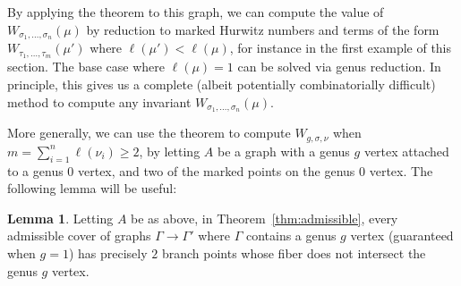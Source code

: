 \documentclass[thesis]{thesis-umich}           %
\theoremstyle{definition}
\newtheorem{lem}[thm]{Lemma}
\begin{document}

                By applying the theorem to this graph, we can compute the value of
                $W_{\sigma_1,\dots,\sigma_n}(\mu)$ by reduction to marked Hurwitz
                numbers and terms of the form
                $W_{\tau_1,\dots,\tau_m}(\mu')$ where $\ell(\mu')<\ell(\mu)$, for instance
                in the first example of this section.
                The base case where $\ell(\mu)=1$ can be solved via genus reduction.
                In principle, this gives us a complete (albeit potentially combinatorially difficult) method to compute any invariant $W_{\sigma_1,\dots,\sigma_n}(\mu)$.

                More generally, we can use the theorem to compute $W_{g,\sigma,\nu}$ when $m=\sum\limits_{i=1}^n\ell(\nu_i)\geq 2$, by letting $A$ be a graph with a genus $g$ vertex attached to a genus $0$ vertex, and two of the
                marked points on the genus $0$ vertex. The following lemma will be useful:

                \begin{lem}
                  \label{lem:branchpoints}
                  Letting $A$ be as above, in Theorem~\ref{thm:admissible}, every admissible cover of graphs $\Gamma\to\Gamma'$ where $\Gamma$ contains a genus $g$ vertex (guaranteed when $g=1$) has precisely $2$ branch points
                  whose fiber does not intersect the genus $g$ vertex.
                \end{lem}
\end{document}
